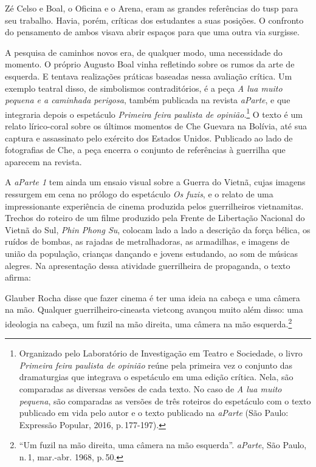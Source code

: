 Zé Celso e Boal, o Oficina e o Arena, eram as grandes referências do
{\sc tusp} para seu trabalho. Havia, porém, críticas dos estudantes a suas
posições. O confronto do pensamento de ambos visava abrir espaços para
que uma outra via surgisse.

A pesquisa de caminhos novos era, de qualquer modo, uma necessidade do
momento. O próprio Augusto Boal vinha refletindo sobre os rumos da arte
de esquerda. E tentava realizações práticas baseadas nessa avaliação
crítica. Um exemplo teatral disso, de simbolismos contraditórios, é a
peça {\it A lua muito pequena e a caminhada perigosa}, também publicada
na revista {\it aParte}, e que integraria depois o espetáculo
{\it Primeira feira paulista de opinião}.\footnote{Organizado
  pelo Laboratório de Investigação em Teatro e Sociedade, o livro {\it Primeira feira paulista de opinião} reúne pela primeira vez o conjunto das dramaturgias que integrava o espetáculo em
  uma edição crítica. Nela, são comparadas as diversas versões de cada
  texto. No caso de {\it A lua muito pequena}, são comparadas as versões
  de três roteiros do espetáculo com o texto publicado em vida pelo
  autor e o texto publicado na {\it aParte} (São Paulo: Expressão
  Popular, 2016, p.\,177-197).} O texto é um relato lírico-coral sobre os
últimos momentos de Che Guevara na Bolívia, até sua captura e
assassinato pelo exército dos Estados Unidos. Publicado ao lado de
fotografias de Che, a peça encerra o conjunto de referências à guerrilha
que aparecem na revista.

A {\it aParte 1} tem ainda um ensaio visual sobre a Guerra do Vietnã,
cujas imagens ressurgem em cena no prólogo do espetáculo {\it Os fuzis},
e o relato de uma impressionante experiência de cinema produzida pelos
guerrilheiros vietnamitas. Trechos do roteiro de um filme produzido pela
Frente de Libertação Nacional do Vietnã do Sul, {\it Phin Phong Su},
colocam lado a lado a descrição da força bélica, os ruídos de bombas, as
rajadas de metralhadoras, as armadilhas, e imagens de união da
população, crianças dançando e jovens estudando, ao som de músicas
alegres. Na apresentação dessa atividade guerrilheira de propaganda, o
texto afirma:

\startblockquote
Glauber Rocha disse que fazer cinema é ter uma ideia na cabeça e uma
câmera na mão. Qualquer guerrilheiro-cineasta vietcong avançou muito
além disso: uma ideologia na cabeça, um fuzil na mão direita, uma câmera
na mão esquerda.\footnote{“Um fuzil na mão direita, uma câmera na mão
  esquerda”. {\it aParte}, São Paulo, n.\,1, mar.-abr. 1968, p.\,50.}
\stopblockquote

